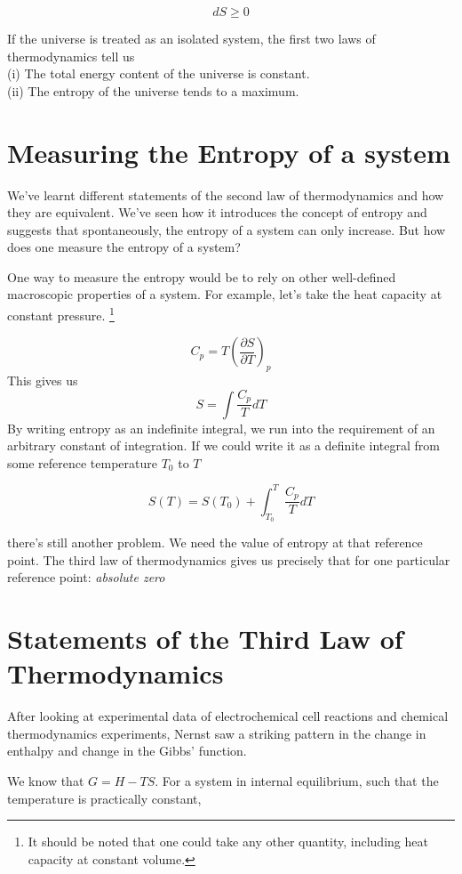 \documentclass{article}
\begin{document}
	$$dS \geq 0 $$
	
	If the universe is treated as an isolated system, the first two laws of thermodynamics tell us\\
	
	\indent(i) The total energy content of the universe is constant.\\
	\indent(ii) The entropy of the universe tends to a maximum.
	
	\section{Measuring the Entropy of a system}
	We've learnt different statements of the second law of thermodynamics and how they are equivalent. We've seen how it introduces the concept of entropy and suggests that spontaneously, the entropy of a system can only increase. But how does one measure the entropy of a system?
	
	One way to measure the entropy would be to rely on other well-defined macroscopic properties of a system. For example, let's take the heat capacity at constant pressure. \footnote{It should be noted that one could take any other quantity, including heat capacity at constant volume.}
	
	$$C_p = T\left(\frac{\partial S}{\partial T}\right)_p $$
	This gives us
	$$ S = \int\frac{C_p}{T}dT $$
	By writing entropy as an indefinite integral, we run into the requirement of an arbitrary constant of integration. If we could write it as a definite integral from some reference temperature $T_0$ to $T$
	
	$$ S(T) = S(T_0) + \int_{T_0}^{T}\frac{C_p}{T}dT$$
	
	there's still another problem. We need the value of entropy at that reference point. The third law of thermodynamics gives us precisely that for one particular reference point: \textit{absolute zero}
	
	\section{Statements of the Third Law of Thermodynamics}
	After looking at experimental data of electrochemical cell reactions and chemical thermodynamics experiments, Nernst saw a striking pattern in the change in enthalpy and change in the Gibbs' function.
	
	We know that $G = H - TS$.
	For a system in internal equilibrium, such that the temperature is practically constant,
	
\end{document}
